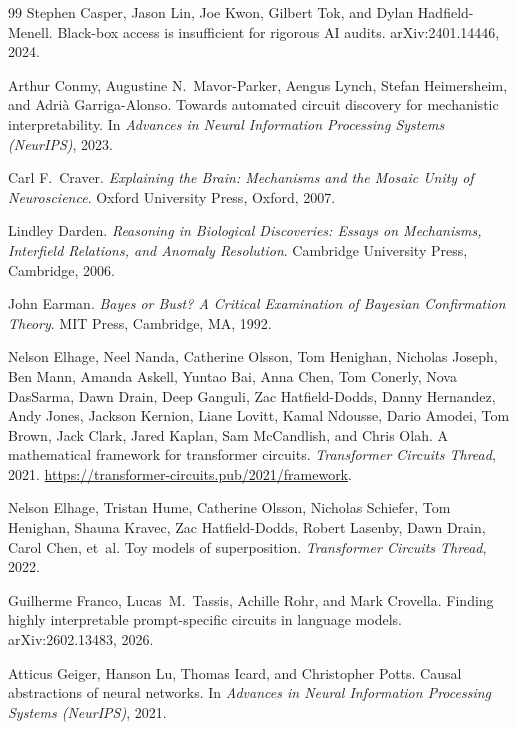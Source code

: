 \documentclass{article}
\begin{document}
\begin{thebibliography}{99}
Stephen Casper, Jason Lin, Joe Kwon, Gilbert Tok, and Dylan Hadfield-Menell.
\newblock Black-box access is insufficient for rigorous {AI} audits.
\newblock arXiv:2401.14446, 2024.

Arthur Conmy, Augustine N.\ Mavor-Parker, Aengus Lynch, Stefan Heimersheim,
  and Adri\`{a} Garriga-Alonso.
\newblock Towards automated circuit discovery for mechanistic interpretability.
\newblock In \emph{Advances in Neural Information Processing Systems (NeurIPS)}, 2023.

Carl F.\ Craver.
\newblock \emph{Explaining the Brain: Mechanisms and the Mosaic Unity of
  Neuroscience}.
\newblock Oxford University Press, Oxford, 2007.

Lindley Darden.
\newblock \emph{Reasoning in Biological Discoveries: Essays on Mechanisms,
  Interfield Relations, and Anomaly Resolution}.
\newblock Cambridge University Press, Cambridge, 2006.

John Earman.
\newblock \emph{Bayes or Bust? A Critical Examination of Bayesian Confirmation
  Theory}.
\newblock MIT Press, Cambridge, MA, 1992.

Nelson Elhage, Neel Nanda, Catherine Olsson, Tom Henighan, Nicholas Joseph,
  Ben Mann, Amanda Askell, Yuntao Bai, Anna Chen, Tom Conerly, Nova DasSarma,
  Dawn Drain, Deep Ganguli, Zac Hatfield-Dodds, Danny Hernandez, Andy Jones,
  Jackson Kernion, Liane Lovitt, Kamal Ndousse, Dario Amodei, Tom Brown, Jack
  Clark, Jared Kaplan, Sam McCandlish, and Chris Olah.
\newblock A mathematical framework for transformer circuits.
\newblock \emph{Transformer Circuits Thread}, 2021.
\newblock \url{https://transformer-circuits.pub/2021/framework}.

Nelson Elhage, Tristan Hume, Catherine Olsson, Nicholas Schiefer, Tom Henighan,
  Shauna Kravec, Zac Hatfield-Dodds, Robert Lasenby, Dawn Drain, Carol Chen,
  et~al.
\newblock Toy models of superposition.
\newblock \emph{Transformer Circuits Thread}, 2022.

Guilherme Franco, Lucas~M.\ Tassis, Achille Rohr, and Mark Crovella.
\newblock Finding highly interpretable prompt-specific circuits in language
  models.
\newblock arXiv:2602.13483, 2026.

Atticus Geiger, Hanson Lu, Thomas Icard, and Christopher Potts.
\newblock Causal abstractions of neural networks.
\newblock In \emph{Advances in Neural Information Processing Systems
  (NeurIPS)}, 2021.


\end{thebibliography}
\end{document}
